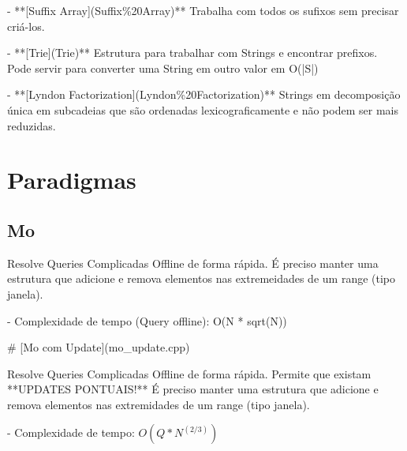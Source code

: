 \documentclass[11pt, a4paper, twoside]{article}
\begin{document}
- **[Suffix Array](Suffix\%20Array)**  
Trabalha com todos os sufixos sem precisar criá-los.

- **[Trie](Trie)**  
Estrutura para trabalhar com Strings e encontrar prefixos. Pode servir para converter uma String em outro valor em O(|S|)

- **[Lyndon Factorization](Lyndon\%20Factorization)**  
Strings em decomposição única em subcadeias que são ordenadas lexicograficamente e não podem ser mais reduzidas.


\newpage
%
%
%
%

\section{Paradigmas}

\subsection{Mo}



Resolve Queries Complicadas Offline de forma rápida.  
É preciso manter uma estrutura que adicione e remova elementos nas extremeidades de um range (tipo janela).

- Complexidade de tempo (Query offline): O(N * sqrt(N))

\# [Mo com Update](mo\_update.cpp)

Resolve Queries Complicadas Offline de forma rápida.   
Permite que existam **UPDATES PONTUAIS!**  
É preciso manter uma estrutura que adicione e remova elementos nas extremidades de um range (tipo janela).

- Complexidade de tempo: $O(Q * N^(2/3))$
\end{document}
